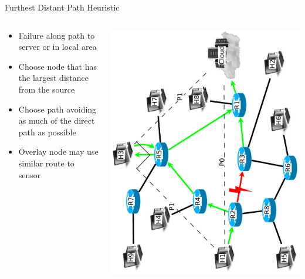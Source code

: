 \documentclass[pdftex]{beamer}
\begin{document}

\begin{frame}{Furthest Distant Path Heuristic}
\begin{columns}
\begin{column}{.5\textwidth}
\begin{itemize}
	\item Failure along path to server or in local area
	\item Choose node that has the largest distance from the source
	\item Choose path avoiding as much of the direct path as possible
	\item Overlay node may use similar route to sensor
\end{itemize}
\end{column}
	
\begin{column}{.5\textwidth}
\includegraphics[height=\textwidth,angle=-90]{angular_path}
\end{column}

\end{columns}
\end{frame}
\end{document}
